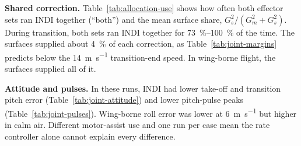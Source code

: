 \documentclass{article}
\begin{document}
\textbf{Shared correction.} Table~\ref{tab:allocation-use} shows how often both effector sets ran INDI together (``both'') and the mean surface share, $G_s^2/(G_m^2+G_s^2)$. During transition, both sets ran INDI together for \SIrange{73}{100}{\percent} of the time. The surfaces supplied about \SI{4}{\percent} of each correction, as Table~\ref{tab:joint-margins} predicts below the \SI{14}{\meter\per\second} transition-end speed. In wing-borne flight, the surfaces supplied all of it.

\begin{table}[H]
\centering
\caption{Use of the shared correction, roll axis: the surfaces take a few per cent of it in the transition and all of it wing-borne.}
\label{tab:allocation-use}
\end{table}

\textbf{Attitude and pulses.} In these runs, INDI had lower take-off and transition pitch error (Table~\ref{tab:joint-attitude}) and lower pitch-pulse peaks (Table~\ref{tab:joint-pulses}). Wing-borne roll error was lower at \SI{6}{\meter\per\second} but higher in calm air. Different motor-assist use and one run per case mean the rate controller alone cannot explain every difference.
\end{document}
